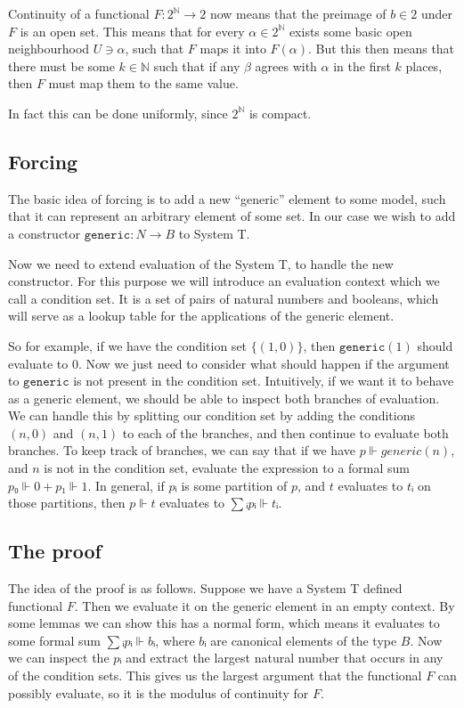 \documentclass{article}
\def\generic{\texttt{generic}}
\begin{document}
Continuity of a functional \(F : 2^ℕ → 2\) now means that the preimage of
\(b ∈ 2\) under \(F\) is an open set.
This means that for every \(α ∈ 2^ℕ\) exists some basic open neighbourhood \(U ∋ α\),
such that \(F\) maps it into \(F(α)\). But this then means that there must be
some \(k ∈ ℕ\) such that if any \(β\) agrees with \(α\) in the first \(k\) places,
then \(F\) must map them to the same value.

In fact this can be done uniformly, since \(2^ℕ\) is compact.

\subsection{Forcing}
The basic idea of forcing is to add a new ``generic'' element to some model,
such that it can represent an arbitrary element of some set.
In our case we wish to add a constructor \(\generic : N → B\) to System T.

Now we need to extend evaluation of the System T, to handle the new constructor.
For this purpose we will introduce an evaluation context which we call a
condition set. It is a set of pairs of natural numbers and booleans, which will
serve as a lookup table for the applications of the generic element.

So for example, if we have the condition set \(\{(1, 0)\}\), then
\(\generic(1)\) should evaluate to \(0\). Now we just need to consider what should
happen if the argument to \(\generic\) is not present in the condition set.
Intuitively, if we want it to behave as a generic element, we should be able to
inspect both branches of evaluation. We can handle this by splitting our
condition set by adding the conditions \((n, 0)\) and \((n, 1)\) to each of the
branches, and then continue to evaluate both branches. To keep track of
branches, we can say that if we have \(p ⊩ generic(n)\), and \(n\) is not in the
condition set, evaluate the expression to a formal sum \(p₀ ⊩ 0 + p₁ ⊩ 1\).
In general, if \(pᵢ\) is some partition of \(p\), and \(t\) evaluates to \(tᵢ\)
on those partitions, then \(p ⊩ t\) evaluates to \(∑ᵢ pᵢ ⊩ tᵢ\).

\subsection{The proof}

The idea of the proof is as follows.
Suppose we have a System T defined functional \(F\). Then we evaluate it on the
generic element in an empty context. By some lemmas we can show this has a
normal form, which means it evaluates to some formal sum \(∑ᵢ pᵢ ⊩ bᵢ\), where
\(bᵢ\) are canonical elements of the type \(B\). Now we can inspect the \(pᵢ\)
and extract the largest natural number that occurs in any of the condition sets.
This gives us the largest argument that the functional \(F\) can possibly
evaluate, so it is the modulus of continuity for \(F\).
\end{document}
